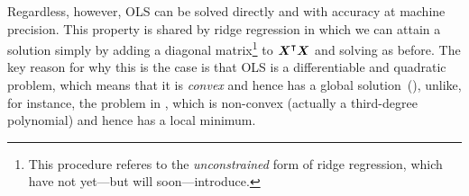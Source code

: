 Regardless, however, OLS can be solved directly and with accuracy at machine precision. This property is shared by ridge regression in which we can attain a solution simply by adding a diagonal matrix\footnote{This procedure referes to the \emph{unconstrained} form of ridge regression, which have not yet---but will soon---introduce.} to \(\boldsymbol{X}^\intercal\boldsymbol{X}\) and solving as before. The key reason for why this is the case is that OLS is a differentiable and quadratic problem, which means that it is \emph{convex} and hence has a global solution~(), unlike, for instance, the problem in , which is non-convex (actually a third-degree polynomial) and hence has a local minimum.

\begin{figure}
  \centering
  \hfill%
  \hfill%

\end{figure}
